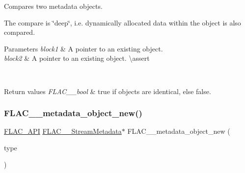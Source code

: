 Compares two metadata objects.

The compare is \char`\"{}deep\char`\"{}, i.\+e. dynamically allocated data within the object is also compared.


\begin{DoxyParams}{Parameters}
{\em block1} & A pointer to an existing object. \\
\hline
{\em block2} & A pointer to an existing object. \textbackslash{}assert 
\begin{DoxyCode}{1}
\end{DoxyCode}
 
\begin{DoxyCode}{1}
\end{DoxyCode}
 \\
\hline
\end{DoxyParams}

\begin{DoxyRetVals}{Return values}
{\em F\+L\+A\+C\+\_\+\+\_\+bool} & {\ttfamily true} if objects are identical, else {\ttfamily false}. \\
\hline
\end{DoxyRetVals}
\mbox{\label{group__flac__metadata__object_ga0d21a62648d8c5321b4b47f8ee5a52f0}} 
\subsubsection{\texorpdfstring{FLAC\_\_metadata\_object\_new()}{FLAC\_\_metadata\_object\_new()}}
{\footnotesize\ttfamily \mbox{\hyperlink{group__flac__export_ga56ca07df8a23310707732b1c0007d6f5}{F\+L\+A\+C\+\_\+\+A\+PI}} \mbox{\hyperlink{struct_f_l_a_c_____stream_metadata}{F\+L\+A\+C\+\_\+\+\_\+\+Stream\+Metadata}}$\ast$ F\+L\+A\+C\+\_\+\+\_\+metadata\+\_\+object\+\_\+new (\begin{DoxyParamCaption}\item[{\mbox{\hyperlink{group__flac__format_gac71714ba8ddbbd66d26bb78a427fac01}{F\+L\+A\+C\+\_\+\+\_\+\+Metadata\+Type}}}]{type }\end{DoxyParamCaption})}

